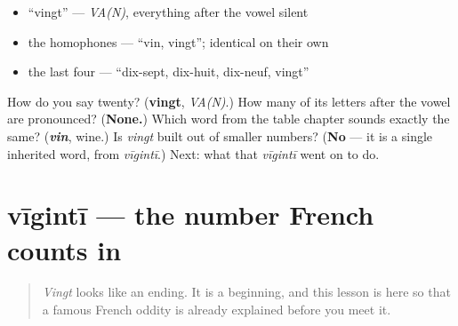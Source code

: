 \begin{itemize}
\raggedright
  \item \textquotedblleft{}vingt\textquotedblright{} — \emph{VA(N)}, everything after the vowel silent
  \item the homophones — \textquotedblleft{}vin, vingt\textquotedblright{}; identical on their own
  \item the last four — \textquotedblleft{}dix-sept, dix-huit, dix-neuf, vingt\textquotedblright{}
\end{itemize}

\begin{tcolorbox}[breakable,colback=teal!4,colframe=teal!35!black,title={Before you move on}]
How do you say twenty? (\textbf{vingt}, \emph{VA(N)}.) How many of its letters after the vowel are pronounced? (\textbf{None.}) Which word from the table chapter sounds exactly the same? (\emph{\textbf{vin}}, wine.) Is \emph{vingt} built out of smaller numbers? (\textbf{No} — it is a single inherited word, from \emph{vīgintī}.) Next: what that \emph{vīgintī} went on to do.
\end{tcolorbox}
\section[vīgintī]{vīgintī — the number French counts in}

\label{lesson:FR-C12-vigesimal}



\begin{quote}
\emph{Vingt} looks like an ending. It is a beginning, and this lesson is here so that a famous French oddity is already explained before you meet it.
\end{quote}

